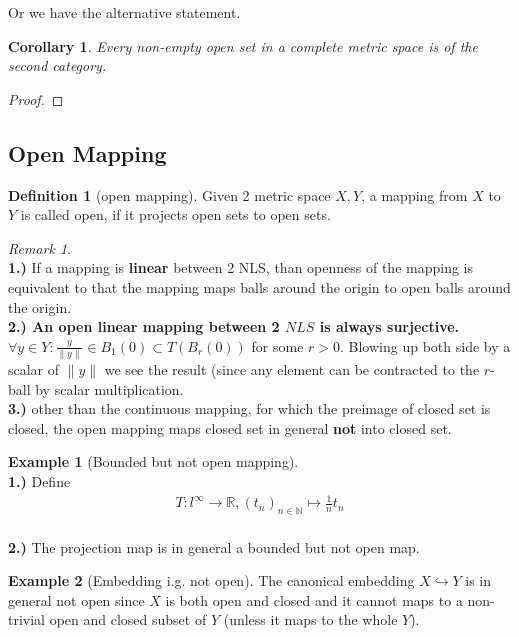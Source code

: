 \documentclass[a4paper,11pt,fleqn]{book}
\newtheorem{corollary}{Corollary}[theorem]
\theoremstyle{definition}
\newtheorem{definition}{Definition}[section]
\newtheorem*{example}{Example}
\theoremstyle{remark}
\newtheorem*{remark}{Remark}
\begin{document}
Or we have the alternative statement.
\begin{corollary}
	Every non-empty open set in a complete metric space is of the second category.
\end{corollary}
\begin{proof}
\end{proof}




\subsection{Open Mapping}
\begin{definition}[open mapping]
	Given 2 metric space $X, Y$, a mapping from $X$ to $Y$ is called open, if it projects open sets to open sets.
\end{definition}
\begin{remark}
\quad\\
\textbf{1.) }If a mapping is \textbf{linear} between 2 NLS, than openness of the mapping is equivalent to that the mapping maps balls around the origin to open balls around the origin.\\
\textbf{2.) An open linear mapping between 2 $NLS$ is always surjective.} $\forall y \in Y: \frac{y}{\|y\|} \in B_1(0) \subset T(B_r(0))$ for some $r > 0$. Blowing up both side by a scalar of $\|y\|$ we see the result (since any element can be contracted to the $r$-ball by scalar multiplication.\\
\textbf{3.)} other than the continuous mapping, for which the preimage of closed set is closed, the open mapping maps closed set in general \textbf{not} into closed set.  
\end{remark}

\begin{example}[Bounded but not open mapping]
\quad\\
\textbf{1.) }Define
	\begin{align*}
		T: l^\infty \rightarrow \mathbb{R}, (t_n)_{n \in \mathbb{N}} \mapsto \frac{1}{n} t_n
	\end{align*}
\quad\\
\textbf{2.)}
	The projection map is in general a bounded but not open map.
\end{example}

\begin{example}[Embedding i.g. not open]
	The canonical embedding $X \hookrightarrow Y$ is in general not open since $X$ is both open and closed and it cannot maps to a non-trivial open and closed subset of $Y$ (unless it maps to the whole $Y$).  
\end{example}
\end{document}
